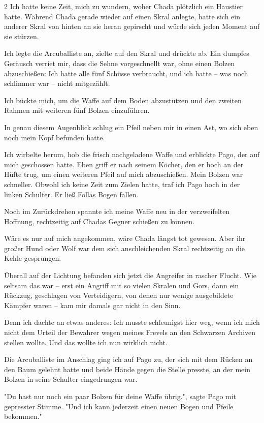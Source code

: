 \documentclass[10pt, a4paper, oneside]{book}
\begin{document}
\begin{multicols}{2}
Ich hatte keine Zeit, mich zu wundern, woher Chada plötzlich ein Haustier hatte. Während Chada gerade wieder auf einen Skral anlegte, hatte sich ein anderer Skral von hinten an sie heran gepirscht und würde sich jeden Moment auf sie stürzen.

Ich legte die Arcuballiste an, zielte auf den Skral und drückte ab. Ein dumpfes Geräusch verriet mir, dass die Sehne vorgeschnellt war, ohne einen Bolzen abzuschießen: Ich hatte alle fünf Schüsse verbraucht, und ich hatte – was noch schlimmer war – nicht mitgezählt.

Ich bückte mich, um die Waffe auf dem Boden abzustützen und den zweiten Rahmen mit weiteren fünf Bolzen einzuführen.

In genau diesem Augenblick schlug ein Pfeil neben mir in einen Ast, wo sich eben noch mein Kopf befunden hatte. 

Ich wirbelte herum, hob die frisch nachgeladene Waffe und erblickte Pago, der auf mich geschossen hatte. Eben griff er nach seinem Köcher, den er hoch an der Hüfte trug, um einen weiteren Pfeil auf mich abzuschießen. Mein Bolzen war schneller. Obwohl ich keine Zeit zum Zielen hatte, traf ich Pago hoch in der linken Schulter. Er ließ Follas Bogen fallen.

Noch im Zurückdrehen spannte ich meine Waffe neu in der verzweifelten Hoffnung, rechtzeitig auf Chadas Gegner schießen zu können.

Wäre es nur auf mich angekommen, wäre Chada längst tot gewesen. Aber ihr großer Hund oder Wolf war dem sich anschleichenden Skral rechtzeitig an die Kehle gesprungen.

Überall auf der Lichtung befanden sich jetzt die Angreifer in rascher Flucht. Wie seltsam das war – erst ein Angriff mit so vielen Skralen und Gors, dann ein Rückzug, geschlagen von Verteidigern, von denen nur wenige ausgebildete Kämpfer waren – kam mir damals gar nicht in den Sinn.

Denn ich dachte an etwas anderes: Ich musste schleunigst hier weg, wenn ich mich nicht dem Urteil der Bewahrer wegen meines Frevels an den Schwarzen Archiven stellen wollte. Und das wollte ich nun wirklich nicht.

Die Arcuballiste im Anschlag ging ich auf Pago zu, der sich mit dem Rücken an den Baum gelehnt hatte und beide Hände gegen die Stelle presste, an der mein Bolzen in seine Schulter eingedrungen war.

"Du hast nur noch ein paar Bolzen für deine Waffe übrig.", sagte Pago mit gepresster Stimme. "Und ich kann jederzeit einen neuen Bogen und Pfeile bekommen."


\end{multicols}
\end{document}
